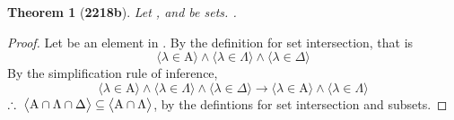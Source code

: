\documentclass[preview]{standalone}
\newtheorem{theorem}{Theorem}
\begin{document}
\begin{theorem}[\textbf{2218b}]
    Let , \bm{$\Lambda$} and \bm{$\Delta$} be sets. 
    .
\end{theorem}
\begin{proof}
    Let \bm{$\lambda$} be an element in . 
    By the definition for set intersection, that is
    \begin{equation*}
        \Big \langle \lambda \in \mathrm{A} \Big \rangle
            \land 
        \Big \langle \lambda \in \Lambda \Big \rangle
            \land 
        \Big \langle \lambda \in \Delta \Big \rangle
    \end{equation*} 
    By the simplification rule of inference,
    \begin{equation*}
        \Big \langle \lambda \in \mathrm{A} \Big \rangle
            \land 
        \Big \langle \lambda \in \Lambda \Big \rangle
            \land 
        \Big \langle \lambda \in \Delta \Big \rangle
            \rightarrow
        \Big \langle \lambda \in \mathrm{A} \Big \rangle
            \land 
        \Big \langle \lambda \in \Lambda \Big \rangle
    \end{equation*} 
    $\therefore \text{\space} \relax{
    \big \langle \mathrm{A} \cap \Lambda \cap \Delta \big \rangle
        \subseteq 
    \big \langle \mathrm{A} \cap \Lambda \big \rangle
    }$,
    by the defintions for set intersection and subsets.
\end{proof}
\end{document}
